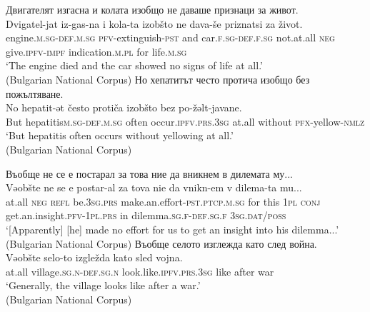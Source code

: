 \documentclass[output=paper,colorlinks=true, citecolor=brown]{langscibook}
\begin{document}
\ea \label{ex:bul:izobshto_00}
    \ea Двигателят изгасна и колата изобщо не даваше признаци за живот.\label{ex:bul:izobshto-negative}\\
        \gll Dvigatel-jat iz-gas-na i kola-ta izobšto ne dava-še priznatsi za život.\\
            engine.\textsc{m.sg}-\textsc{def.m.sg} \textsc{pfv}-extinguish-\textsc{pst} and car.\textsc{f.sg}-\textsc{def.f.sg} not.at.all \textsc{neg} give.\textsc{ipfv}-\textsc{impf} indication\textsc{.m.pl} for life.\textsc{m.sg} \\ 
        \glt `The engine died and the car showed no signs of life at all.' \\(Bulgarian National Corpus)
    \ex Но хепатитът често протича изобщо без пожълтяване. \label{ex:bul:izobshto-positive}\\
        \gll No hepatit-ət često protiča izobšto bez po-žəlt-javane.\\
            But hepatitis\textsc{m.sg}-\textsc{def.m.sg} often occur.\textsc{ipfv.prs.3sg} at.all without \textsc{pfx}-yellow-\textsc{nmlz}\\
        \glt `But hepatitis often occurs without yellowing at all.' \\(Bulgarian National Corpus)
    \z 
\z

\ea \label{ex:bul:vaobshte_00}
    \ea Въобще не се е постарал за това ние да вникнем в дилемата му...\label{ex:bul:vaobshte-negative}\\
        \gll Vəobšte ne se e postar-al za tova nie da vnikn-em v dilema-ta mu...\\
            at.all \textsc{neg} \textsc{refl} be.\textsc{3sg.prs} make.an.effort-\textsc{pst.ptcp.m.sg} for this \textsc{1pl} \textsc{conj} get.an.insight.\textsc{pfv}-\textsc{1pl.prs} in dilemma.\textsc{sg.f}-\textsc{def.sg.f} \textsc{3sg.dat\slash poss}\\
        \glt `[Apparently] [he] made no effort for us to get an insight into his dilemma...' \\(Bulgarian National Corpus)
    \ex Въобще селото изглежда като след война. \label{ex:bul:vaobshte-positive}\\
        \gll Vəobšte selo-to izgležda kato sled vojna.\\
            at.all village.\textsc{sg.n}-\textsc{def.sg.n} look.like.\textsc{ipfv.prs.3sg} like after war\\
        \glt `Generally, the village looks like after a war.' \\(Bulgarian National Corpus)
    \z 
\z
\end{document}
